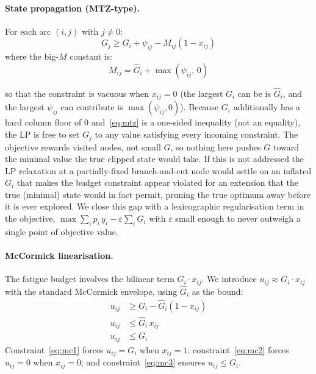 \documentclass[11pt,a4paper]{article}
\begin{document}
\paragraph{State propagation (MTZ-type).}
For each arc $(i,j)$ with $j \neq 0$:
\begin{equation}
  G_j \geq G_i + \psi_{ij} - M_{ij}(1 - x_{ij})
  \label{eq:mtz}
\end{equation}
where the big-$M$ constant is:
\begin{equation}
  M_{ij} = \hat{G}_i + \max(\psi_{ij},\, 0)
  \label{eq:bigM}
\end{equation}

so that the constraint is vacuous when $x_{ij}=0$ (the largest $G_i$ can be is $\hat{G}_i$, and the largest $\psi_{ij}$ can contribute is $\max(\psi_{ij},0)$).
Because $G_i$ additionally has a hard column floor of $0$ and~\eqref{eq:mtz} is a one-sided inequality (not an equality), the LP is free to set $G_j$ to any value satisfying every incoming constraint. The objective rewards visited nodes, not small $G$, so nothing here pushes $G$ toward the minimal value the true clipped state would take.
If this is not addressed the LP relaxation at a partially-fixed branch-and-cut node would settle on an inflated $G_i$ that makes the budget constraint appear violated for an extension that the true (minimal) state would in fact permit, pruning the true optimum away before it is ever explored.
We close this gap with a lexicographic regularisation term in the objective, $\max \sum_i p_i\,y_i - \varepsilon\sum_i G_i$ with $\varepsilon$ small enough to never outweigh a single point of objective value.

\paragraph{McCormick linearisation.}
The fatigue budget involves the bilinear term $G_i \cdot x_{ij}$.
We introduce $u_{ij} \approx G_i \cdot x_{ij}$ with the standard McCormick envelope, using $\hat{G}_i$ as the bound:
\begin{align}
  u_{ij} &\geq G_i - \hat{G}_i(1 - x_{ij}) \label{eq:mc1} \\
  u_{ij} &\leq \hat{G}_i \, x_{ij} \label{eq:mc2} \\
  u_{ij} &\leq G_i \label{eq:mc3}
\end{align}
Constraint~\eqref{eq:mc1} forces $u_{ij} = G_i$ when $x_{ij} = 1$; constraint~\eqref{eq:mc2} forces $u_{ij} = 0$ when $x_{ij} = 0$; and constraint~\eqref{eq:mc3} ensures $u_{ij} \leq G_i$.
\end{document}
